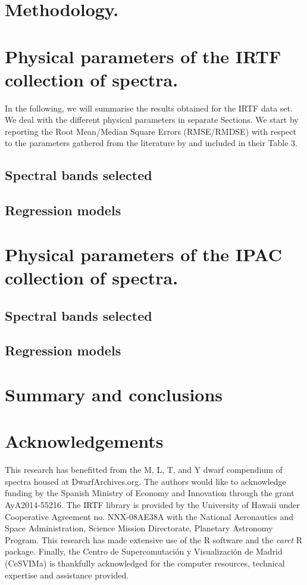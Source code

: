 \documentclass[a4paper,fleqn,usenatbib]{mnras}
\begin{document}
\section{Methodology.}
\label{sec:meth}


\section{Physical parameters of the IRTF collection of spectra.}
\label{sec:irtf}

In the following, we will summarise the results obtained for the IRTF
data set. We deal with the different physical parameters in separate
Sections. We start by reporting the Root Mean/Median Square Errors
(RMSE/RMDSE) with respect to the parameters gathered from the
literature by \cite{cesetti} and included in their Table 3.

\subsection{Spectral bands selected}

\subsection{Regression models}


\section{Physical parameters of the IPAC collection of spectra.}
\label{sec:ipac}

\subsection{Spectral bands selected}

\subsection{Regression models}


\section{Summary and conclusions}
\label{sec:summary}


\section*{Acknowledgements}
This research has benefitted from the M, L, T, and Y dwarf compendium
of spectra housed at DwarfArchives.org.  The authors would like to
acknowledge funding by the Spanish Ministry of Economy and Innovation
through the grant AyA2014-55216. The IRTF library is provided by the
University of Hawaii under Cooperative Agreement no. NNX-08AE38A with
the National Aeronautics and Space Administration, Science Mission
Directorate, Planetary Astronomy Program. This research has made
extensive use of the R software \cite{R} and the {\it caret} R
package. Finally, the Centro de Supercomutaci\'on y Visualizaci\'on 
de Madrid (CeSVIMa) is thankfully acknowledged for the computer
resources, technical expertise and assistance provided.
\end{document}
